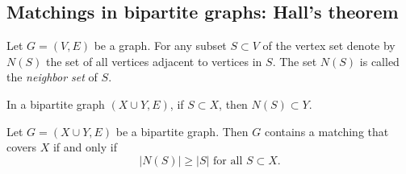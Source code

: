 \begin{page}

\subsection{Matchings in bipartite graphs: Hall's theorem}

\end{page}

\begin{page}

\begin{dfn}
Let $G = (V, E)$ be a graph.
For any subset $S \subset V$ of the vertex set denote by $N(S)$ the set of all vertices adjacent to vertices in $S$.
The set $N(S)$ is called the \emph{neighbor set} of $S$.
\end{dfn}

\end{page}

\begin{page}


In a bipartite graph $(X \cup Y, E)$, if $S \subset X$, then $N(S) \subset Y$.



\end{page}

\begin{page}

\begin{thm}[Hall]
\label{thm:Hall}
Let $G = (X \cup Y, E)$ be a bipartite graph.
Then $G$ contains a matching that covers $X$ if and only if
\begin{equation}
\label{eqn:Hall}
|N(S)| \ge |S| \text{ for all } S \subset X.
\end{equation}
\end{thm}

\end{page}

